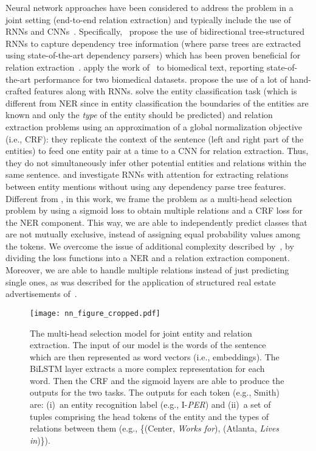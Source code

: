 \documentclass[review]{elsarticle}
\newcommand{\eg}{e.g., }
\newcommand{\ie}{i.e., }
\begin{document}
Neural network approaches have been considered to address the problem in a joint setting (end-to-end relation extraction) and typically include the use of RNNs and CNNs~\citep{miwa:16,zheng:17,li:17}. 
Specifically,~\cite{miwa:16} propose
the use of bidirectional tree-structured RNNs to capture dependency tree information (where parse trees are extracted using state-of-the-art dependency parsers) which has been proven beneficial for relation extraction~\citep{xu:15b,xu:15a}. 
\cite{li:17} apply the work of~\cite{miwa:16} to biomedical text, reporting state-of-the-art performance for two biomedical datasets.
\cite{gupta:16} propose the use of a lot of hand-crafted features along with RNNs. \cite{heike:17} solve the entity classification task (which is different from NER since in entity classification the boundaries of the entities are known and only the \emph{type} of the entity should be predicted) and relation extraction problems using an approximation of a global normalization objective (\ie CRF): they replicate the context of the sentence (left and right part of the entities) to feed one entity pair at a time to a CNN for relation extraction. Thus, they do not simultaneously infer other potential entities and relations within the same sentence. 
\cite{katiyar:17} and \cite{bekoulis:18} investigate RNNs with attention for extracting relations between entity mentions without using any dependency parse tree features. 
Different from \cite{katiyar:17}, in this work, we frame the problem as a multi-head selection problem by using a sigmoid loss to obtain multiple relations and a CRF loss for the NER component. This way, we are able to independently predict classes that are not mutually exclusive, instead of assigning equal probability values among the tokens.
We overcome the issue of additional complexity described by~\cite{bekoulis:18}, by dividing the loss functions into a NER and a relation extraction component. Moreover, we are able to handle multiple relations instead of just predicting single ones, as was described for the application of structured real estate advertisements of~\cite{bekoulis:18}.


\begin{figure}\texttt{[image: nn\_figure\_cropped.pdf]}
				\caption{The multi-head selection model for joint entity and relation extraction. The input of our model is the words of the sentence which are then represented as word vectors (\ie embeddings). The BiLSTM layer extracts a more complex representation for each word. Then the CRF and the sigmoid layers are able to produce the outputs for the two tasks.
The outputs for each token (\eg Smith) are:  
(i)~an entity recognition label (\eg I-\emph{PER}) and
(ii)~a set of tuples comprising the head tokens of the entity and the types of relations between them (\eg \{(Center, \emph{Works for}), (Atlanta, \emph{Lives in})\}).
}
\label{fig:model}
\end{figure}
\end{document}
